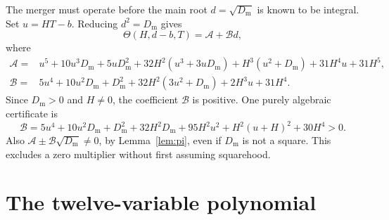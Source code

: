 \documentclass[11pt,a4paper]{article}
\theoremstyle{definition}\newtheorem{definition}[theorem]{Definition}
\theoremstyle{remark}\newtheorem{remark}[theorem]{Remark}
\newcommand{\Dm}{D_{\mathrm m}}\newcommand{\Df}{D_{\mathrm f}}
\numberwithin{equation}{section}
\begin{document}
The merger must operate before the main root $d=\sqrt{\Dm}$ is known to
be integral. Set $u=HT-b$. Reducing $d^2=\Dm$ gives
\begin{equation}
 \Theta(H,d-b,T)=\mathcal A+\mathcal B d,
 \label{eq:AB}
\end{equation}
where
\begin{align}
 \mathcal A={}&u^5+10u^3\Dm+5u\Dm^2
       +32H^2(u^3+3u\Dm)+H^3(u^2+\Dm)
       +31H^4u+31H^5,\nonumber\\
 \mathcal B={}&5u^4+10u^2\Dm+\Dm^2
       +32H^2(3u^2+\Dm)+2H^3u+31H^4.
 \label{eq:ABexplicit}
\end{align}
Since $\Dm>0$ and $H\ne0$, the coefficient $\mathcal B$ is positive.
One purely algebraic certificate is
\[
 \mathcal B=5u^4+10u^2\Dm+\Dm^2+32H^2\Dm
 +95H^2u^2+H^2(u+H)^2+30H^4>0.
\]
Also $\mathcal A\pm\mathcal B\sqrt{\Dm}\ne0$, by
Lemma~\ref{lem:pi}, even if $\Dm$ is not a square. This excludes a
zero multiplier without first assuming squarehood.

\section{The twelve-variable polynomial}
\label{sec:polynomial12}
\end{document}
